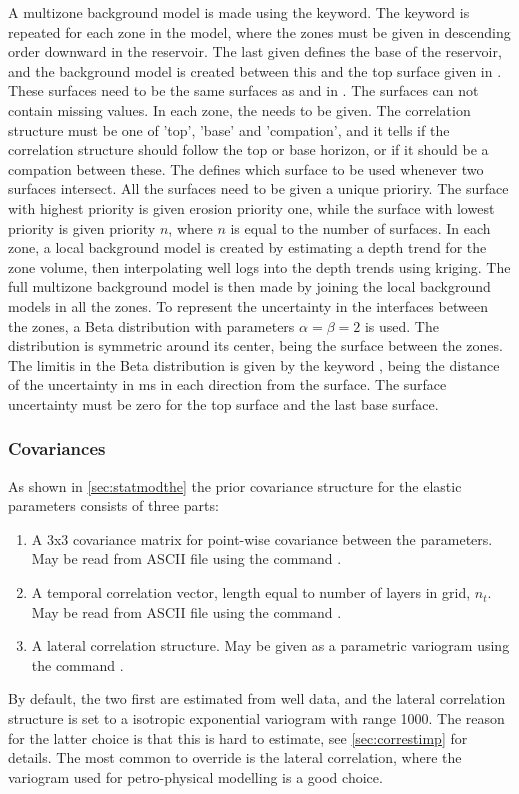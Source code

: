A multizone background model is made using the  keyword. The  keyword is repeated for each zone in the model, where the zones must be given in descending order downward in the reservoir. The last  given defines the base of the reservoir, and the background model is created between this and the top surface given in . These surfaces need to be the same surfaces as  and  in . The surfaces can not contain missing values. In each zone, the  needs to be given. The correlation structure must be one of 'top', 'base' and 'compation', and it tells if the correlation structure should follow the top or base horizon, or if it should be a compation between these. The  defines which surface to be used whenever two surfaces intersect. All the surfaces need to be given a unique prioriry. The surface with highest priority is given erosion priority one, while the surface with lowest priority is given priority $n$, where $n$ is equal to the number of surfaces. In each zone, a local background model is created by estimating a depth trend for the zone volume, then interpolating well logs into the depth trends using kriging. The full multizone background model is then made by joining the local background models in all the zones. To represent the uncertainty in the interfaces between the zones, a Beta distribution with parameters  $\alpha=\beta=2$ is used. The distribution is symmetric around its center, being the surface between the zones. The limitis in the Beta distribution is given by the keyword , being the distance of the uncertainty in ms in each direction from the surface. The surface uncertainty must be zero for the top surface and the last base surface. 
\subsubsection{Covariances}
\label{sec:basiccorr}
As shown in \autoref{sec:statmodthe} the prior covariance structure for the elastic parameters consists of three parts:
\begin{enumerate}
\item A 3x3 covariance matrix for point-wise covariance between the parameters. May be read from ASCII file using the command .
\item A temporal correlation vector, length equal to number of layers in grid, $n_t$. May be read from ASCII file using the command .
\item A lateral correlation structure. May be given as a parametric variogram using the command .
\end{enumerate}
By default, the two first are estimated from well data, and the lateral correlation structure is set to a isotropic exponential variogram with range 1000. The reason for the latter choice is that this is hard to estimate, see \autoref{sec:correstimp} for details. The most common to override is the lateral correlation, where the variogram used for petro-physical modelling is a good choice.
